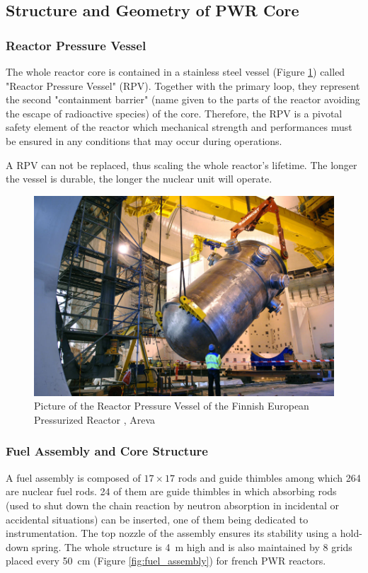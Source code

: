 \subsection{Structure and Geometry of PWR Core}


\subsubsection{Reactor Pressure Vessel}

The whole reactor core is contained in a stainless steel vessel (Figure \ref{fig:vessel_pic}) called "Reactor Pressure Vessel" (RPV). Together with the primary loop, they represent the second "containment barrier" (name given to the parts of the reactor avoiding the escape of radioactive species) of the core. Therefore, the RPV is a pivotal safety element of the reactor which mechanical strength and performances must be ensured in any conditions that may occur during operations.

\begin{note*}{}
A RPV can not be replaced, thus scaling the whole reactor's lifetime. The longer the vessel is durable, the longer the nuclear unit will operate.
\end{note*}




\begin{figure}[!h]
\centering
\includegraphics[width=0.6\linewidth]{img/intro/vessel_pic.jpg}
\caption{Picture of the Reactor Pressure Vessel of the Finnish European Pressurized Reactor \cite{nouvelle_cuve_2010}, \textcopyright Areva}
\label{fig:vessel_pic}
\end{figure}

\npar


\subsubsection{Fuel Assembly and Core Structure}

A fuel assembly is composed of $17 \times 17$ rods and guide thimbles among which 264 are nuclear fuel rods. 24 of them are guide thimbles in which absorbing rods (used to shut down the chain reaction by neutron absorption in incidental or accidental situations) can be inserted, one of them being dedicated to instrumentation. The top nozzle of the assembly ensures its stability using a hold-down spring. The whole structure is 4\ m high and is also maintained by 8 grids placed every 50\ cm (Figure \ref{fig:fuel_assembly}) for french PWR reactors. 



